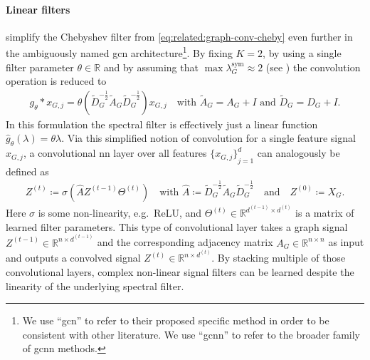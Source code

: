 \paragraph{Linear filters}
\citet{Kipf2017} simplify the Chebyshev filter from \cref{eq:related:graph-conv-cheby} even further in the ambiguously named \ac{gcn} architecture\footnote{
	We use ``\acs{gcn}'' to refer to their proposed specific method in order to be consistent with other literature.
	We use ``\acs{gcnn}'' to refer to the broader family of \acl{gcnn} methods.
}.
By fixing $K = 2$, by using a single filter parameter $\theta \in \mathbb{R}$ and by assuming that $\max{\lambda_G^{\text{sym}}} \approx 2$ (see ) the convolution operation is reduced to
\begin{align}
	g_{\theta} * x_{G,j} = \theta \left( \tilde{D}_G^{-\frac{1}{2}} \tilde{A}_G \tilde{D}_G^{-\frac{1}{2}} \right) x_{G,j}
	\quad\text{with $\tilde{A}_G = A_G + I$ and $\tilde{D}_G = D_G + I$.} \label{eq:related:graph-conv-gcn}
\end{align}
In this formulation the spectral filter is effectively just a linear function $\hat{g}_{\theta}(\lambda) = \theta \lambda$.
Via this simplified notion of convolution for a single feature signal $x_{G,j}$, a convolutional \acl{nn} layer over all features ${\{ x_{G,j} \}}_{j=1}^{d}$ can analogously be defined as
\begin{align}
	Z^{(t)} \coloneqq \sigma\left( \hat{A} Z^{(t-1)} \Theta^{(t)} \right)
	\quad\text{with } \hat{A} \coloneqq \tilde{D}_G^{-\frac{1}{2}} \tilde{A}_G \tilde{D}_G^{-\frac{1}{2}}\quad\text{and}\quad Z^{(0)} \coloneqq X_G \text{.} \label{eq:related:gcn-layer}
\end{align}
Here $\sigma$ is some non-linearity, e.g.\ ReLU, and $\Theta^{(t)} \in \mathbb{R}^{d^{(t-1)} \times d^{(t)}}$ is a matrix of learned filter parameters.
This type of convolutional layer takes a graph signal $Z^{(t-1)} \in \mathbb{R}^{n \times d^{(t-1)}}$ and the corresponding adjacency matrix $A_G \in \mathbb{R}^{n \times n}$ as input and outputs a convolved signal $Z^{(t)} \in \mathbb{R}^{n \times d^{(t)}}$.
By stacking multiple of those convolutional layers, complex non-linear signal filters can be learned despite the linearity of the underlying spectral filter.

